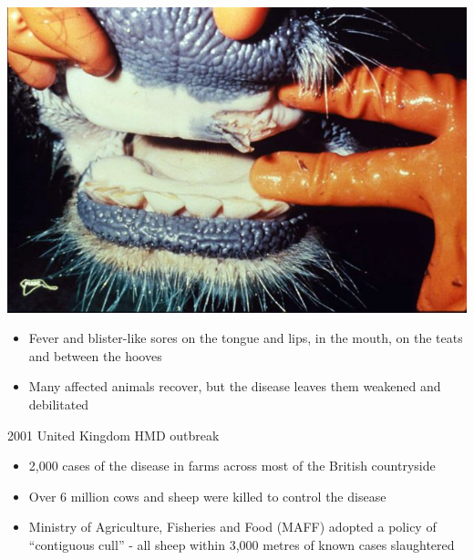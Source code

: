 \documentclass[aspectratio=43]{beamer}
\begin{document}
\begin{frame}{}
  \begin{minipage}{0.3\textwidth}
    \includegraphics[width=1.1\textwidth]{../FIGS/Foot_and_mouth_disease_in_mouth.jpg}
  \end{minipage}
  \begin{minipage}{0.65\textwidth}
    \begin{itemize}
      \item Fever and blister-like sores on the tongue and lips, in the mouth, on the teats and between the hooves
      \item Many affected animals recover, but the disease leaves them weakened and debilitated
    \end{itemize}
  \end{minipage}
\end{frame}


\begin{frame}{2001 United Kingdom HMD outbreak}
  \begin{itemize}
    \item 2,000 cases of the disease in farms across most of the British countryside
    \vfill
    \item Over 6 million cows and sheep were killed to control the disease
    \vfill
    \item Ministry of Agriculture, Fisheries and Food (MAFF) adopted a policy of ``contiguous cull'' - all sheep within 3,000 metres of known cases slaughtered
  \end{itemize}
\end{frame}

\end{document}
